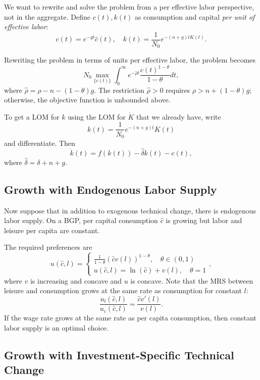 \documentclass{tufte-handout}
\theoremstyle{definition}
\begin{document}
We want to rewrite and solve the problem from a per effective labor perspective, not in the aggregate. Define $c(t), k(t)$ as consumption and capital \emph{per unit of effective labor}: \[
	c(t) = e^{-gt} \hat{c}(t), \quad k(t) = \frac{1}{N_0} e^{-\left( n+g \right)t K(t)}
.\] 

Rewriting the problem in terms of units per effective labor, the problem becomes \[
	N_0 \max_{\{c(t)\}} \int_{0}^{\infty} e^{-\hat{\rho}t} \frac{c(t)^{1-\theta}}{1-\theta}dt 
,\] where $\hat{\rho} = \rho - n - \left( 1-\theta \right)g$. The restriction $\hat{\rho} > 0$ requires $\rho > n + \left( 1-\theta \right)g$; otherwise, the objective function is unbounded above.

To get a LOM for $k$ using the LOM for $\dot{K}$ that we already have, write \[
	k(t) = \frac{1}{N_0} e^{-\left( n+g \right)t}K(t)
\] and differentiate. Then \[
	\dot{k}(t) = f(k(t)) - \hat{\delta} k(t) - c(t)
,\] where $\hat{\delta} = \delta + n + g$.

\subsection{Growth with Endogenous Labor Supply}

Now suppose that in addition to exogenous technical change, there is endogenous labor supply. On a BGP, per capital consumption $\hat{c}$ is growing but labor and leisure per capita are constant. 

The required preferences are \[
	u(\hat{c},l) = \begin{cases}
		\frac{1}{1-\theta} \left( \hat{c}v(l) \right)^{1-\theta}, \quad \theta \in (0,1) \\
		u(\hat{c},l) = \ln{(\hat{c})} + v\left( l \right), \quad \theta = 1
	\end{cases}
,\] where $v$ is increasing and concave and $u$ is concave. Note that the MRS between leisure and consumption grows at the same rate as consumption for constant $l$: \[
	\frac{u_l(\hat{c},l)}{u_c(\hat{c},l)} = \frac{\hat{c}v'(l)}{v(l)}
.\] 
If the wage rate grows at the same rate as per capita consumption, then constant labor supply is an optimal choice.

\subsection{Growth with Investment-Specific Technical Change}
\end{document}
